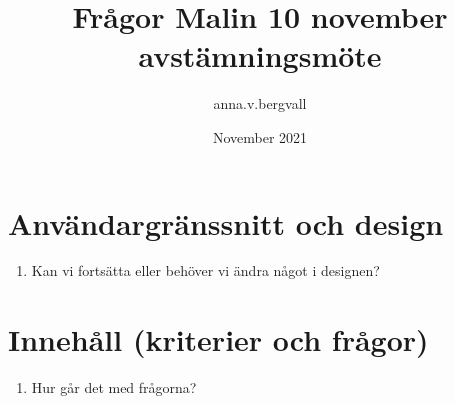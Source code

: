 \documentclass{article}
\title{Frågor Malin 10 november avstämningsmöte}
\author{anna.v.bergvall }
\date{November 2021}
\begin{document}
\maketitle

\section{Användargränssnitt och design}
\begin{enumerate}
    \item Kan vi fortsätta eller behöver vi ändra något i designen?
\end{enumerate}

\section{Innehåll (kriterier och frågor)}
\begin{enumerate}
    \item Hur går det med frågorna?
\end{enumerate}
\end{document}
